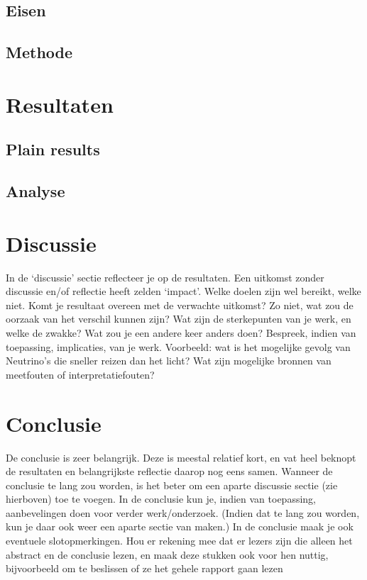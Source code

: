 \documentclass{report}
\begin{document}
\section{Eisen}


\section{Methode}


\chapter{Resultaten}

\section{Plain results}



\section{Analyse}
\chapter {Discussie}
In de ‘discussie’ sectie reﬂecteer je op de resultaten. Een uitkomst zonder discussie en/of reﬂectie
heeft zelden ‘impact’. Welke doelen zijn wel bereikt, welke niet. Komt je resultaat overeen met de
verwachte uitkomst? Zo niet, wat zou de oorzaak van het verschil kunnen zijn? Wat zijn de sterkepunten van je werk, en welke de zwakke? Wat zou je een andere keer anders doen? Bespreek, indien
van toepassing, implicaties, van je werk. Voorbeeld: wat is het mogelijke gevolg van Neutrino’s die
sneller reizen dan het licht? Wat zijn mogelijke bronnen van meetfouten of interpretatiefouten?

\chapter{Conclusie}
De conclusie is zeer belangrijk. Deze is meestal relatief kort, en vat heel beknopt de resultaten en
belangrijkste reﬂectie daarop nog eens samen. Wanneer de conclusie te lang zou worden, is het beter
om een aparte discussie sectie (zie hierboven) toe te voegen. In de conclusie kun je, indien van
toepassing, aanbevelingen doen voor verder werk/onderzoek. (Indien dat te lang zou worden, kun je
daar ook weer een aparte sectie van maken.) In de conclusie maak je ook eventuele slotopmerkingen.
Hou er rekening mee dat er lezers zijn die alleen het abstract en de conclusie lezen, en maak deze
stukken ook voor hen nuttig, bijvoorbeeld om te beslissen of ze het gehele rapport gaan lezen
\end{document}
